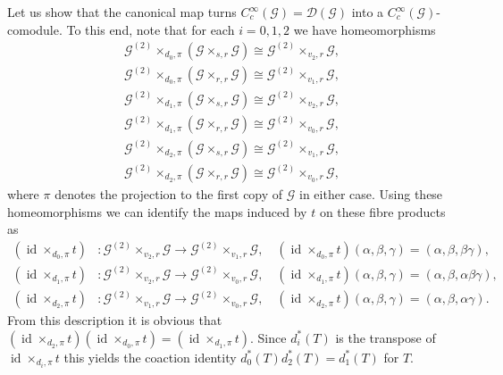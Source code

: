 \documentclass{amsart}
\newcommand{\G}{\mathcal{G}}
\newcommand{\DG}{\mathcal{D}(\mathcal{G})}
\newcommand{\ccinfty}{C_c^\infty}
\DeclareMathOperator{\id}{id}
\begin{document}
Let us show that the canonical map turns $ \ccinfty(\G) = \DG $ into a $ \ccinfty(\G) $-comodule. To this end, note that for each $ i = 0,1,2 $ we have homeomorphisms
\begin{align*} 
\G^{(2)} \times_{d_0, \pi}(\G \times_{s,r} \G) \cong \G^{(2)} \times_{v_2, r} \G, \\
\G^{(2)} \times_{d_0, \pi}(\G \times_{r,r} \G) \cong \G^{(2)} \times_{v_1, r} \G, \\ 
\G^{(2)} \times_{d_1, \pi}(\G \times_{s,r} \G) \cong \G^{(2)} \times_{v_2, r} \G, \\
\G^{(2)} \times_{d_1, \pi}(\G \times_{r,r} \G) \cong \G^{(2)} \times_{v_0, r} \G, \\
\G^{(2)} \times_{d_2, \pi}(\G \times_{s,r} \G) \cong \G^{(2)} \times_{v_1, r} \G, \\
\G^{(2)} \times_{d_2, \pi}(\G \times_{r,r} \G) \cong \G^{(2)} \times_{v_0, r} \G, 
\end{align*} 
where $ \pi $ denotes the projection to the first copy of $ \G $ in either case. 
Using these homeomorphisms we can identify the maps induced by $ t $ on these fibre products as 
\begin{align*}
(\id \times_{d_0,\pi} t)&:\G^{(2)} \times_{v_2,r}\G \rightarrow \G^{(2)} \times_{v_1,r}\G, \quad (\id \times_{d_0,\pi} t)(\alpha,\beta,\gamma) = (\alpha, \beta, \beta \gamma), \\
(\id \times_{d_1,\pi} t)&:\G^{(2)} \times_{v_2,r}\G \rightarrow \G^{(2)} \times_{v_0,r}\G, \quad (\id \times_{d_1,\pi} t)(\alpha,\beta,\gamma) = (\alpha, \beta, \alpha\beta\gamma),\\
(\id \times_{d_2,\pi} t)&:\G^{(2)} \times_{v_1,r}\G \rightarrow \G^{(2)} \times_{v_0,r}\G, \quad (\id \times_{d_2,\pi} t)(\alpha,\beta,\gamma)=(\alpha, \beta, \alpha \gamma).
\end{align*}
From this description it is obvious that $ (\id \times_{d_2,\pi} t) (\id \times_{d_0,\pi} t) = (\id \times_{d_1,\pi} t) $. Since $ d_i^*(T) $ is the transpose of $ \id \times_{d_i,\pi} t $ this yields the coaction identity $ d_0^*(T) d_2^*(T) = d_1^*(T) $ for $ T $.
\end{document}
